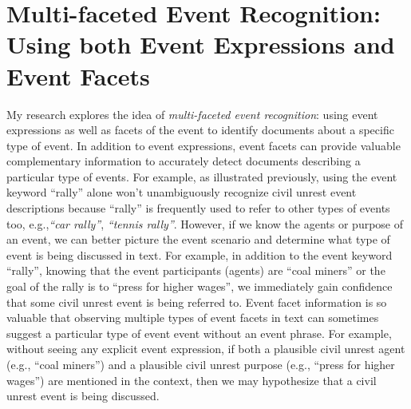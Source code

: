 

\section{Multi-faceted Event Recognition: Using both Event Expressions and Event Facets}
\label{multi-faceted-idea}
My research explores the idea of {\it multi-faceted event
  recognition}: using event expressions as well as facets of the event
to identify documents about
a specific type of event.  
In addition to event expressions, event facets can provide 
valuable complementary information to accurately detect documents describing 
a particular type of events. For example, as illustrated previously, 
using the event keyword ``rally'' alone won't unambiguously recognize 
civil unrest event descriptions because ``rally'' is frequently used 
to refer to other types of events too, 
e.g.,{\it ``car rally''}, {\it ``tennis rally''}.  
However, if we 
know 
the agents or purpose of 
an event, we can 
better picture the event scenario and determine what type of event 
is being discussed in text. For example, in addition to the event keyword 
``rally'', knowing that the event participants (agents) are ``coal miners'' or the 
goal 
of the rally is to ``press for higher wages'', we immediately 
gain confidence that some civil unrest event is being referred to. 
Event facet information is so valuable that observing multiple types of 
event facets in text can 
sometimes suggest a particular type of event 
event without an event phrase.
For example, without seeing any explicit event expression, if both 
a 
plausible civil unrest agent (e.g., ``coal miners'') and a 
plausible
civil unrest purpose (e.g., ``press for higher wages'') are mentioned in 
the context, then we 
may hypothesize 
that a civil unrest event 
is being discussed.




